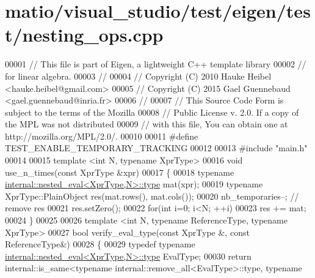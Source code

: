 \hypertarget{matio_2visual__studio_2test_2eigen_2test_2nesting__ops_8cpp_source}{}\section{matio/visual\+\_\+studio/test/eigen/test/nesting\+\_\+ops.cpp}
\label{matio_2visual__studio_2test_2eigen_2test_2nesting__ops_8cpp_source}

\begin{DoxyCode}
00001 \textcolor{comment}{// This file is part of Eigen, a lightweight C++ template library}
00002 \textcolor{comment}{// for linear algebra.}
00003 \textcolor{comment}{//}
00004 \textcolor{comment}{// Copyright (C) 2010 Hauke Heibel <hauke.heibel@gmail.com>}
00005 \textcolor{comment}{// Copyright (C) 2015 Gael Guennebaud <gael.guennebaud@inria.fr>}
00006 \textcolor{comment}{//}
00007 \textcolor{comment}{// This Source Code Form is subject to the terms of the Mozilla}
00008 \textcolor{comment}{// Public License v. 2.0. If a copy of the MPL was not distributed}
00009 \textcolor{comment}{// with this file, You can obtain one at http://mozilla.org/MPL/2.0/.}
00010 
00011 \textcolor{preprocessor}{#define TEST\_ENABLE\_TEMPORARY\_TRACKING}
00012 
00013 \textcolor{preprocessor}{#include "main.h"}
00014 
00015 \textcolor{keyword}{template} <\textcolor{keywordtype}{int} N, \textcolor{keyword}{typename} XprType>
00016 \textcolor{keywordtype}{void} use\_n\_times(\textcolor{keyword}{const} XprType &xpr)
00017 \{
00018   \textcolor{keyword}{typename} \hyperlink{class_eigen_1_1internal_1_1_tensor_lazy_evaluator_writable}{internal::nested\_eval<XprType,N>::type} mat(xpr);
00019   \textcolor{keyword}{typename} XprType::PlainObject res(mat.rows(), mat.cols());
00020   nb\_temporaries--; \textcolor{comment}{// remove res}
00021   res.setZero();
00022   \textcolor{keywordflow}{for}(\textcolor{keywordtype}{int} i=0; i<N; ++i)
00023     res += mat;
00024 \}
00025 
00026 \textcolor{keyword}{template} <\textcolor{keywordtype}{int} N, \textcolor{keyword}{typename} ReferenceType, \textcolor{keyword}{typename} XprType>
00027 \textcolor{keywordtype}{bool} verify\_eval\_type(\textcolor{keyword}{const} XprType &, \textcolor{keyword}{const} ReferenceType&)
00028 \{
00029   \textcolor{keyword}{typedef} \textcolor{keyword}{typename} \hyperlink{class_eigen_1_1internal_1_1_tensor_lazy_evaluator_writable}{internal::nested\_eval<XprType,N>::type} EvalType;
00030   \textcolor{keywordflow}{return} internal::is\_same<typename internal::remove\_all<EvalType>::type, \textcolor{keyword}{typename} 

\end{DoxyCode}
